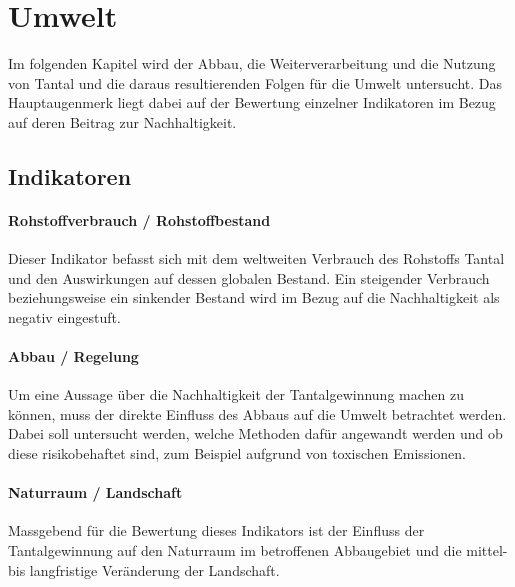 \section{Umwelt}\label{sec:solutions}

Im folgenden Kapitel wird der Abbau, die Weiterverarbeitung und die Nutzung von
Tantal und die daraus resultierenden Folgen für die Umwelt untersucht.
Das Hauptaugenmerk liegt dabei auf der Bewertung einzelner Indikatoren im Bezug
auf deren Beitrag zur Nachhaltigkeit.
\subsection{Indikatoren}

\paragraph{Rohstoffverbrauch / Rohstoffbestand}
Dieser Indikator befasst sich mit dem weltweiten  Verbrauch des Rohstoffs
Tantal und den Auswirkungen auf dessen globalen Bestand. Ein steigender
Verbrauch beziehungsweise ein sinkender Bestand wird im Bezug auf die
Nachhaltigkeit als negativ eingestuft.

\paragraph{Abbau / Regelung}
Um eine Aussage über die Nachhaltigkeit der Tantalgewinnung machen zu können,
muss der direkte Einfluss des Abbaus auf die Umwelt betrachtet werden. Dabei
soll untersucht werden, welche Methoden dafür angewandt werden und ob diese
risikobehaftet sind, zum Beispiel aufgrund von toxischen Emissionen.

\paragraph{Naturraum / Landschaft}
Massgebend für die Bewertung dieses Indikators ist der Einfluss der
Tantalgewinnung auf den Naturraum im betroffenen Abbaugebiet und die mittel- bis
langfristige Veränderung der Landschaft.

